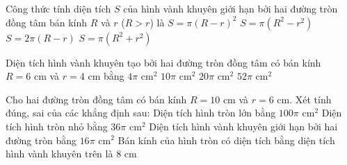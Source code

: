 \begin{ex}%
	Công thức tính diện tích $S$ của hình vành khuyên giới hạn bởi hai đường tròn đồng tâm bán kính $R$ và $r$ ($R > r$) là
	\choice
	{$S = \pi(R - r)^2$}
	{\True $S = \pi(R^2 - r^2)$}
	{$S = 2\pi(R - r)$}
	{$S = \pi(R^2 + r^2)$}
\end{ex}

\begin{ex}%
	Diện tích hình vành khuyên tạo bởi hai đường tròn đồng tâm có bán kính $R = 6\text{ cm}$ và $r = 4\text{ cm}$ bằng
	\choice
	{$4\pi\text{ cm}^2$}
	{$10\pi\text{ cm}^2$}
	{\True $20\pi\text{ cm}^2$}
	{$52\pi\text{ cm}^2$}
\end{ex}

\begin{ex}%
	Cho hai đường tròn đồng tâm có bán kính $R = 10\text{ cm}$ và $r = 6\text{ cm}$. Xét tính đúng, sai của các khẳng định sau:
	\choiceTF
	{\True Diện tích hình tròn lớn bằng $100\pi\text{ cm}^2$}
	{\True Diện tích hình tròn nhỏ bằng $36\pi\text{ cm}^2$}
	{Diện tích hình vành khuyên giới hạn bởi hai đường tròn bằng $16\pi\text{ cm}^2$}
	{\True Bán kính của hình tròn có diện tích bằng diện tích hình vành khuyên trên là $8\text{ cm}$}
\end{ex}

